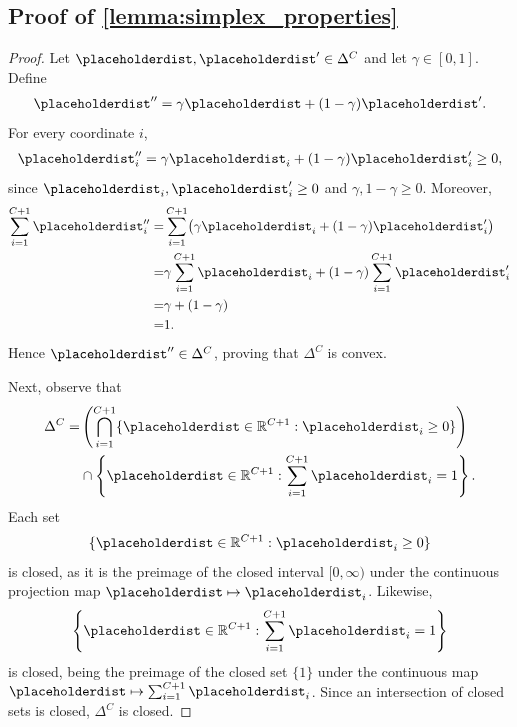 \subsection{Proof of \cref{lemma:simplex_properties}}
\label{subsec:proof_simplex_properties}
\lemmaSimplex*
\begin{proof}
    Let $\placeholderdist,\placeholderdist^{\prime} \in \Delta^C$ and let $\gamma\in[0,1]$. Define
    \begin{align*}
        \placeholderdist^{\prime\prime} = \gamma \placeholderdist + (1-\gamma)\placeholderdist^{\prime}.
    \end{align*}
    For every coordinate $i$,
    \begin{align*}
        \placeholderdist^{\prime\prime}_i = \gamma \placeholderdist_i + (1-\gamma)\placeholderdist^{\prime}_i \ge 0,
    \end{align*}
    since $\placeholderdist_i,\placeholderdist^{\prime}_i\ge 0$ and $\gamma,1-\gamma\ge 0$. Moreover,
    \begin{align*}
        \sum_{i=1}^{C+1} \placeholderdist^{\prime\prime}_i = & \sum_{i=1}^{C+1}\bigl(\gamma \placeholderdist_i+(1-\gamma)\placeholderdist^{\prime}_i\bigr)        \\
        =                                                    & \gamma\sum_{i=1}^{C+1} \placeholderdist_i + (1-\gamma)\sum_{i=1}^{C+1} \placeholderdist^{\prime}_i \\
        =                                                    & \gamma+(1-\gamma)                                                                                  \\
        =                                                    & 1.
    \end{align*}
    Hence $\placeholderdist^{\prime\prime}\in\Delta^C$, proving that $\Delta^C$ is convex.

    Next, observe that
    \begin{align*}
        \Delta^C = & \left(\bigcap_{i=1}^{C+1}\{\placeholderdist\in\mathbb R^{C+1}: \placeholderdist_i\ge 0\}\right) \\
                   & \cap
        \left\{\placeholderdist\in\mathbb R^{C+1}:\sum_{i=1}^{C+1} \placeholderdist_i = 1\right\}.
    \end{align*}
    Each set
    \begin{align*}
        \{\placeholderdist\in\mathbb R^{C+1}: \placeholderdist_i\ge 0\}
    \end{align*}
    is closed, as it is the preimage of the closed interval
    $[0,\infty)$ under the continuous projection map
    $\placeholderdist\mapsto \placeholderdist_i$. Likewise,
    \begin{align*}
        \left\{
        \placeholderdist\in\mathbb R^{C+1}:
        \sum_{i=1}^{C+1} \placeholderdist_i = 1
        \right\}
    \end{align*}
    is closed, being the preimage of the closed set $\{1\}$
    under the continuous map
    $\placeholderdist\mapsto \sum_{i=1}^{C+1} \placeholderdist_i$.
    Since an intersection of closed sets is closed,
    $\Delta^C$ is closed.


\end{proof}
